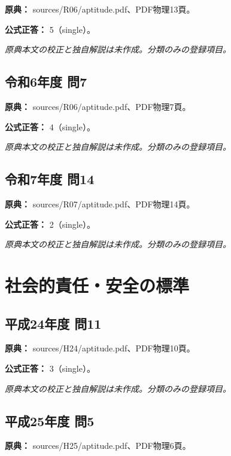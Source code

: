 \noindent\textbf{原典：} sources/R06/aptitude.pdf、PDF物理13頁。

\textbf{公式正答：} 5（single）。

\par\textit{原典本文の校正と独自解説は未作成。分類のみの登録項目。}

\subsection{令和6年度 問7}
\label{q:r06-reg-apt-07}

\noindent\textbf{原典：} sources/R06/aptitude.pdf、PDF物理7頁。

\textbf{公式正答：} 4（single）。

\par\textit{原典本文の校正と独自解説は未作成。分類のみの登録項目。}

\subsection{令和7年度 問14}
\label{q:r07-reg-apt-14}

\noindent\textbf{原典：} sources/R07/aptitude.pdf、PDF物理14頁。

\textbf{公式正答：} 2（single）。

\par\textit{原典本文の校正と独自解説は未作成。分類のみの登録項目。}

\section{社会的責任・安全の標準}

\subsection{平成24年度 問11}
\label{q:h24-reg-apt-11}

\noindent\textbf{原典：} sources/H24/aptitude.pdf、PDF物理10頁。

\textbf{公式正答：} 3（single）。

\par\textit{原典本文の校正と独自解説は未作成。分類のみの登録項目。}

\subsection{平成25年度 問5}
\label{q:h25-reg-apt-05}

\noindent\textbf{原典：} sources/H25/aptitude.pdf、PDF物理6頁。

